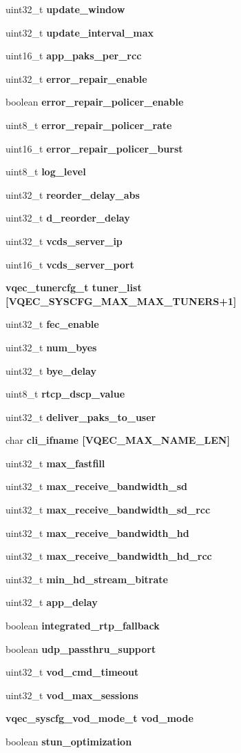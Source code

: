 \begin{CompactItemize}
\item 
uint32\_\-t \bf{update\_\-window}
\item 
uint32\_\-t \bf{update\_\-interval\_\-max}
\item 
uint16\_\-t \bf{app\_\-paks\_\-per\_\-rcc}
\item 
uint32\_\-t \bf{error\_\-repair\_\-enable}
\item 
boolean \bf{error\_\-repair\_\-policer\_\-enable}
\item 
uint8\_\-t \bf{error\_\-repair\_\-policer\_\-rate}
\item 
uint16\_\-t \bf{error\_\-repair\_\-policer\_\-burst}
\item 
uint8\_\-t \bf{log\_\-level}
\item 
uint32\_\-t \bf{reorder\_\-delay\_\-abs}
\item 
uint32\_\-t \bf{d\_\-reorder\_\-delay}
\item 
uint32\_\-t \bf{vcds\_\-server\_\-ip}
\item 
uint16\_\-t \bf{vcds\_\-server\_\-port}
\item 
\bf{vqec\_\-tunercfg\_\-t} \bf{tuner\_\-list} [VQEC\_\-SYSCFG\_\-MAX\_\-MAX\_\-TUNERS+1]
\item 
uint32\_\-t \bf{fec\_\-enable}
\item 
uint32\_\-t \bf{num\_\-byes}
\item 
uint32\_\-t \bf{bye\_\-delay}
\item 
uint8\_\-t \bf{rtcp\_\-dscp\_\-value}
\item 
uint32\_\-t \bf{deliver\_\-paks\_\-to\_\-user}
\item 
char \bf{cli\_\-ifname} [VQEC\_\-MAX\_\-NAME\_\-LEN]
\item 
uint32\_\-t \bf{max\_\-fastfill}
\item 
uint32\_\-t \bf{max\_\-receive\_\-bandwidth\_\-sd}
\item 
uint32\_\-t \bf{max\_\-receive\_\-bandwidth\_\-sd\_\-rcc}
\item 
uint32\_\-t \bf{max\_\-receive\_\-bandwidth\_\-hd}
\item 
uint32\_\-t \bf{max\_\-receive\_\-bandwidth\_\-hd\_\-rcc}
\item 
uint32\_\-t \bf{min\_\-hd\_\-stream\_\-bitrate}
\item 
uint32\_\-t \bf{app\_\-delay}
\item 
boolean \bf{integrated\_\-rtp\_\-fallback}
\item 
boolean \bf{udp\_\-passthru\_\-support}
\item 
uint32\_\-t \bf{vod\_\-cmd\_\-timeout}
\item 
uint32\_\-t \bf{vod\_\-max\_\-sessions}
\item 
\bf{vqec\_\-syscfg\_\-vod\_\-mode\_\-t} \bf{vod\_\-mode}
\item 
boolean \bf{stun\_\-optimization}
\end{CompactItemize}


